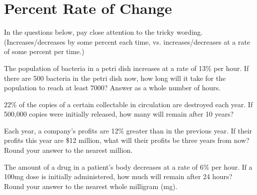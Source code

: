 \section*{Percent Rate of Change}
In the questions below, pay close attention to the tricky wording. (Increases/decreases by some percent each time, vs. increases/decreases at a rate of some percent per time.)
\begin{senum}
\item The population of bacteria in a petri dish increases at a rate of 13\% per hour. If there are 500 bacteria in the petri dish now, how long will it take for the population to reach at least 7000? Answer as a whole number of hours.
\item 22\% of the copies of a certain collectable in circulation are destroyed each year. If 500,000 copies were initially released, how many will remain after 10 years?
\item Each year, a company's profits are 12\% greater than in the previous year. If their profits this year are \$12 million, what will their profits be three years from now? Round your answer to the nearest million.
\item The amount of a drug in a patient's body decreases at a rate of 6\% per hour. If a 100mg dose is initially administered, how much will remain after 24 hours? Round your answer to the nearest whole milligram (mg).
\end{senum}

